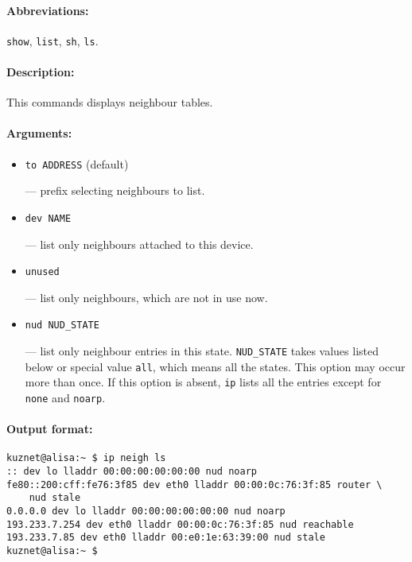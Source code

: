 \paragraph{Abbreviations:} \verb|show|, \verb|list|, \verb|sh|, \verb|ls|.

\paragraph{Description:}This commands displays neighbour tables.

\paragraph{Arguments:}

\begin{itemize}

\item \verb|to ADDRESS| (default)

--- prefix selecting neighbours to list.

\item \verb|dev NAME|

--- list only neighbours attached to this device.

\item \verb|unused|

--- list only neighbours, which are not in use now.

\item \verb|nud NUD_STATE|

--- list only neighbour entries in this state. \verb|NUD_STATE| takes
values listed below or special value \verb|all|, which means all the states.
This option may occur more than once. If this option is absent, \verb|ip|
lists all the entries except for \verb|none| and \verb|noarp|.

\end{itemize}


\paragraph{Output format:}

\begin{verbatim}
kuznet@alisa:~ $ ip neigh ls
:: dev lo lladdr 00:00:00:00:00:00 nud noarp
fe80::200:cff:fe76:3f85 dev eth0 lladdr 00:00:0c:76:3f:85 router \
    nud stale
0.0.0.0 dev lo lladdr 00:00:00:00:00:00 nud noarp
193.233.7.254 dev eth0 lladdr 00:00:0c:76:3f:85 nud reachable
193.233.7.85 dev eth0 lladdr 00:e0:1e:63:39:00 nud stale
kuznet@alisa:~ $ 
\end{verbatim}

